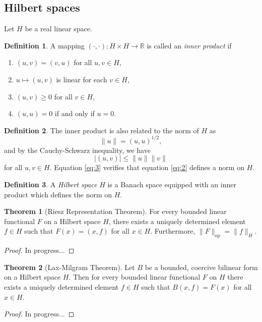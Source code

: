 \documentclass[11pt]{article}
\theoremstyle{definition}
\newtheorem*{theorem}{Theorem}
\newtheorem*{definition}{Definition}
\begin{document}
\subsection{Hilbert spaces}
Let $H$ be a real linear space.
\begin{definition}
	A mapping $(\cdot , \cdot) : H \times H \rightarrow \mathbb{R}$ is called an \textit{inner product} if
	\begin{enumerate}
		\item $(u,v) = (v,u)$ for all $u,v \in H$,
		\item $u \mapsto (u,v)$ is linear for each $v \in H$,
		\item $(u,v) \geq 0$ for all $v \in H$,
		\item $(u,u) = 0$ if and only if $u = 0$.
	\end{enumerate}
\end{definition}
\begin{definition}
	The inner product is also related to the norm of $H$ as
	\begin{equation}
		\label{eq:2}
		\|u\| = (u,u)^{1/2},
	\end{equation}
	and by the Cauchy-Schwarz inequality, we have
	\begin{equation}
		\label{eq:3}
		|(u,v)| \leq \|u\|\|v\|
	\end{equation}
	for all $u,v \in H$. Equation \ref{eq:3} verifies that equation \ref{eq:2} defines a norm on $H$. 
\end{definition}
\begin{definition}
	A \textit{Hilbert space} $H$ is a Banach space equipped with an inner product which defines the norm on $H$.
\end{definition}

\begin{theorem}[Riesz Representation Theorem]
	For every bounded linear functional $F$ on a Hilbert space $H$, there exists a uniquely determined element $f \in H$
	such that $F(x) = (x,f)$ for all $x \in H$. Furthermore, $\|F\|_{\text{op}} = \|f\|_H$.
\end{theorem}
\begin{proof}
	In progress...
\end{proof}

\begin{theorem}[Lax-Milgram Theorem]
	Let $B$ be a bounded, coercive bilinear form on a Hilbert space $H$. Then for every bounded linear functional $F$ on $H$
	there exists a uniquely determined element $f\in H$ such that $B(x,f) = F(x)$ for all $x \in H$.
\end{theorem}
\begin{proof}
	In progress...
\end{proof}
\end{document}
